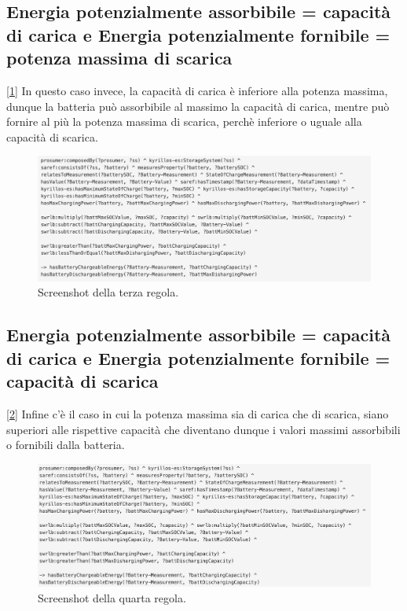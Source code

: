 \subsection{Energia potenzialmente assorbibile = capacità di carica e Energia potenzialmente fornibile = potenza massima di scarica}

[\ref*{fig:charginggreater}] In questo caso invece, la capacità di carica è inferiore alla potenza massima, dunque la batteria può assorbibile al massimo la capacità di carica,
mentre può fornire al più la potenza massima di scarica, perchè inferiore o uguale alla capacità di scarica.

\begin{figure}[H]
    \centering
    \includegraphics[width=15cm]{images/charging >.png}
    \caption{Screenshot della terza regola.}
    \label{fig:charginggreater}
\end{figure}

\subsection{Energia potenzialmente assorbibile = capacità di carica e Energia potenzialmente fornibile = capacità di scarica}

[\ref*{fig:bothgreater}] Infine c'è il caso in cui la potenza massima sia di carica che di scarica, siano superiori alle rispettive capacità che diventano dunque i valori massimi assorbibili o fornibili dalla batteria.

\begin{figure}[H]
    \centering
    \includegraphics[width=15cm]{images/both >.png}
    \caption{Screenshot della quarta regola.}
    \label{fig:bothgreater}
\end{figure}

